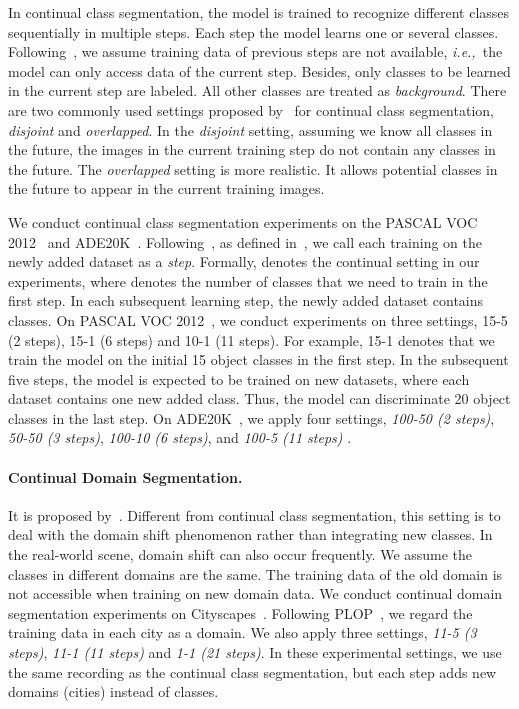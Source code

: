 \documentclass[10pt,twocolumn,letterpaper]{article}
\def\ie{\emph{i.e.,~}}
\begin{document}
In continual class segmentation, the model is trained to recognize different classes sequentially in multiple steps. Each step the model learns one or several classes. Following~\cite{mib,plop,sdr}, we assume training data of previous steps are not available, \ie the model can only access data of the current step. Besides, only classes to be learned in the current step are labeled. All other classes are treated as \emph{background}.  
There are two commonly used settings proposed by~\cite{mib} for continual class segmentation,
\emph{disjoint} and \emph{overlapped}.
In the \emph{disjoint} setting,
assuming we know all classes in the future,
the images in the current training step do not contain any classes in the future.
The \emph{overlapped} setting is more realistic.
It allows potential classes in the future to appear in the current training images.



We conduct continual class segmentation experiments on the PASCAL VOC 2012~\cite{pascal-voc-2012}
and ADE20K~\cite{zhou2017scene}.
Following~\cite{mib,plop,sdr},
as defined in~,
we call each training on the newly added dataset as a \emph{step}.
Formally,
 denotes the continual setting in our experiments,
where  denotes the number of classes that we need to train in the first step.
In each subsequent learning step,
the newly added dataset contains  classes.
On PASCAL VOC 2012~\cite{pascal-voc-2012},
we conduct experiments on three settings,
15-5 (2 steps),
15-1 (6 steps) and 10-1 (11 steps).
For example,
15-1 denotes that we train the model on the initial 15 object classes in the first step.
In the subsequent five steps,
the model is expected to be trained on new datasets, where each dataset contains one new added class.
Thus, the model can discriminate 20 object classes in the last step.
On ADE20K~\cite{zhou2017scene},
we apply four settings,
\emph{100-50 (2 steps)},
\emph{50-50 (3 steps)},
\emph{100-10 (6 steps)},
and
\emph{100-5 (11 steps)}
.






\paragraph{Continual Domain Segmentation.} It is proposed by~\cite{plop}.
Different from continual class segmentation,
this setting is to deal with the domain shift phenomenon rather than integrating new classes.
In the real-world scene,
domain shift can also occur frequently.
We assume the classes in different domains are the same.
The training data of the old domain is not accessible when training on new domain data.
We conduct continual domain segmentation experiments on Cityscapes~\cite{cordts2016cityscapes}.
Following PLOP~\cite{plop},
we regard the training data in each city as a domain.
We also apply three settings, \emph{11-5 (3 steps)},
\emph{11-1 (11 steps)} and \emph{1-1 (21 steps)}.
In these experimental settings,
we use the same recording as the continual class segmentation,
but each step adds new domains (cities) instead of classes.
\end{document}
